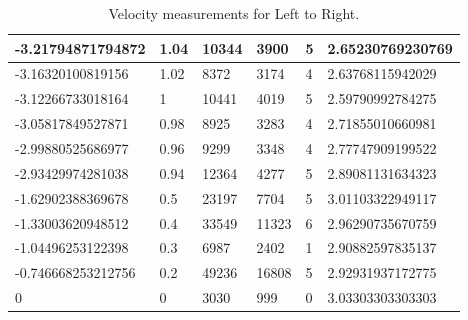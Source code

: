 \documentclass[a4paper]{report}
\numberwithin{equation}{section}
\begin{document}
\begin{table}[!ht]
\begin{tabular}{|l|l|l|l|l|l|}
        -3.21794871794872 & 1.04 & 10344 & 3900 & 5 & 2.65230769230769 \\ \hline
        -3.16320100819156 & 1.02 & 8372 & 3174 & 4 & 2.63768115942029 \\ \hline
        -3.12266733018164 & 1 & 10441 & 4019 & 5 & 2.59790992784275 \\ \hline
        -3.05817849527871 & 0.98 & 8925 & 3283 & 4 & 2.71855010660981 \\ \hline
        -2.99880525686977 & 0.96 & 9299 & 3348 & 4 & 2.77747909199522 \\ \hline
        -2.93429974281038 & 0.94 & 12364 & 4277 & 5 & 2.89081131634323 \\ \hline
        -1.62902388369678 & 0.5 & 23197 & 7704 & 5 & 3.01103322949117 \\ \hline
        -1.33003620948512 & 0.4 & 33549 & 11323 & 6 & 2.96290735670759 \\ \hline
        -1.04496253122398 & 0.3 & 6987 & 2402 & 1 & 2.90882597835137 \\ \hline
        -0.746668253212756 & 0.2 & 49236 & 16808 & 5 & 2.92931937172775 \\ \hline
        0 & 0 & 3030 & 999 & 0 & 3.03303303303303 \\ \hline
    \end{tabular}
    \caption{Velocity measurements for Left to Right.}
\end{table}
\end{document}
